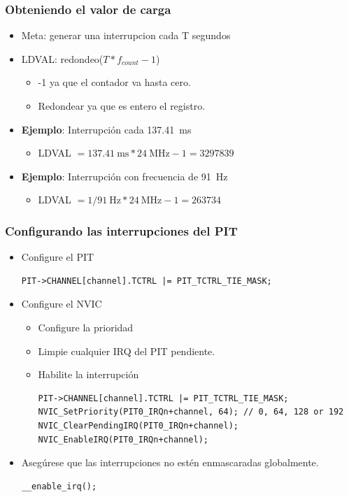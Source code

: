 \documentclass[10.5pt,scale=1.0,t,aspectratio=169,hyperref={pdfpagelabels=false}]{beamer}
\begin{document}
\begin{frame}[fragile]
	\frametitle{Obteniendo el valor de carga}
	{\small
		\begin{itemize}
			\setlength\itemsep{0em}
			\item Meta: generar una interrupcion cada T segundos
			\item LDVAL: redondeo($T * f_{count} - 1$)
			\begin{itemize}
				\item -1 ya que el contador va hasta cero.
				\item Redondear ya que es entero el registro. 
			\end{itemize}
			\item \textbf{Ejemplo}: Interrupción cada \SI{137.41}{\milli\second}
			\begin{itemize}
				\item LDVAL $=\SI{137.41}{\milli\second} * \SI{24}{\mega\hertz} - 1 = 3297839$
			\end{itemize}
			\item \textbf{Ejemplo}: Interrupción con frecuencia de  \SI{91}{\hertz}
			\begin{itemize}
				\item LDVAL $=1/\SI{91}{\hertz} * \SI{24}{\mega\hertz} - 1 = 263734$
			\end{itemize}
		\end{itemize}
	}
\end{frame}
\begin{frame}[fragile]
	\frametitle{Configurando las interrupciones del PIT}
	{\small
		\begin{itemize}
			\setlength\itemsep{0em}
			\item Configure el PIT
			\begin{lstlisting}[style=CStyle]
PIT->CHANNEL[channel].TCTRL |= PIT_TCTRL_TIE_MASK;			
			\end{lstlisting}
			\item Configure el NVIC
			\begin{itemize}
				\item Configure la prioridad
				\item Limpie cualquier IRQ del PIT pendiente.
				\item Habilite la interrupción
				\begin{lstlisting}[style=CStyle]
PIT->CHANNEL[channel].TCTRL |= PIT_TCTRL_TIE_MASK;
NVIC_SetPriority(PIT0_IRQn+channel, 64); // 0, 64, 128 or 192
NVIC_ClearPendingIRQ(PIT0_IRQn+channel);
NVIC_EnableIRQ(PIT0_IRQn+channel);		
				\end{lstlisting}
			\end{itemize}
		
			\item Asegúrese que las interrupciones no estén enmascaradas globalmente. 
			\begin{lstlisting}[style=CStyle]
__enable_irq();	
			\end{lstlisting}
		\end{itemize}
	}
\end{frame}
\end{document}
